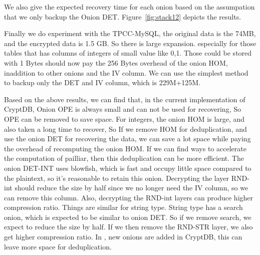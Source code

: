 








We also give the expected recovery time for each onion based on the assumpation that we only backup the Onion DET. Figure~\ref{fig:stack12} depicts the results.


Finally we do experiment with the TPCC-MySQL, the original data is the 74MB, and the encrypted data is 1.5 GB. So there is large expansion. especially for those tables that has columns of integers of small value like 0,1. Those could be stored with 1 Bytes should now pay the 256 Bytes overhead of the onion HOM, inaddition to other onions and the IV column. We can use the simplest method to backup only the DET and IV column, which is 229M+125M. 







Based on the above results, we can find that, in the current implementation of CryptDB, Onion OPE is always small and can not be used for recovering, So OPE can be removed  to save space. For integers, the onion HOM is large, and also taken a long time to recover, So If we remove HOM for deduplication, and use the onion DET for recovering the data, we can save a lot space while paying the overhead of recomputing the onion HOM. If we can find ways to accelerate the computation of pailliar, then this deduplication can be more efficient. The onion DET-INT uses blowfish, which is fast and occupy little space compared to the plaintext, so it's reasonable to retain this onion. Decrypting the layer RND-int should reduce the size by half since we no longer need the IV column, so we can remove this column. Also, decrypting the RND-int layers can produce higher compression ratio. Things are similar for string type. String type has a search onion, which is expected to be similar to onion DET. So if we remove search, we expect to reduce the size by half. If we then remove the RND-STR layer, we also get higher compression ratio. In \citep{popa2015guidelines}, new onions are added in CryptDB, this can leave more space for deduplication.

